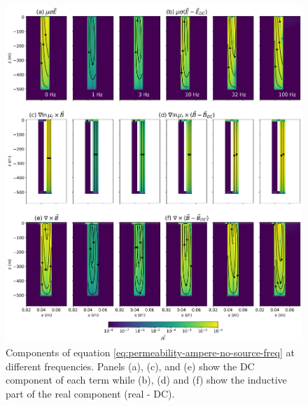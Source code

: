 \begin{figure}
    \begin{center}
    \includegraphics[width=\textwidth]{figures/magnetization-currents-casing-freq-real.png}
    \end{center}
\caption{
    Components of equation \ref{eq:permeability-ampere-no-source-freq} at different frequencies. Panels (a), (c), and (e) show the DC component of each term while (b), (d) and (f) show the inductive part of the real component (real - DC).
}
\label{fig:magnetization-currents-casing-freq-real}
\end{figure}



